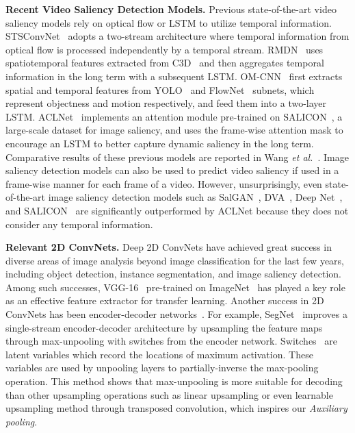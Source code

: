\documentclass[10pt,twocolumn,letterpaper]{article}
\newcommand{\auxpnamet}{Auxiliary pooling}
\newcommand{\auxpname}{\textit{\auxpnamet}}
\begin{document}
\textbf{Recent Video Saliency Detection Models.} Previous state-of-the-art video saliency models  rely on optical flow or LSTM to utilize temporal information. STSConvNet~\cite{bak2018spatio} adopts a two-stream architecture where temporal information from optical flow is processed independently by a temporal stream. RMDN~\cite{bazzani2016recurrent} uses spatiotemporal features extracted from C3D~\cite{tran2015learning} and then aggregates temporal information in the long term with a subsequent LSTM. OM-CNN~\cite{jiang2017predicting} first extracts spatial and temporal features from YOLO~\cite{redmon2016you} and FlowNet~\cite{dosovitskiy2015flownet} subnets, which represent objectness and motion respectively, and feed them into a two-layer LSTM. ACLNet~\cite{wang2018revisiting} implements an attention module pre-trained on SALICON~\cite{jiang2015salicon}, a large-scale dataset for image saliency, and uses the frame-wise attention mask to encourage an LSTM to better capture dynamic saliency in the long term. Comparative results of these previous models are reported in Wang \textit{et al.}~\cite{wang2018revisiting}. Image saliency detection models can also be used to predict video saliency if used in a frame-wise manner for each frame of a video. However, unsurprisingly, even state-of-the-art image saliency detection models such as SalGAN~\cite{pan2017salgan}, DVA~\cite{wang2018deep}, Deep Net~\cite{pan2016shallow}, and SALICON~\cite{huang2015salicon} are significantly outperformed by ACLNet because they does not consider any temporal information.

\textbf{Relevant 2D ConvNets.} Deep 2D ConvNets have achieved great success in diverse areas of image analysis beyond image classification for the last few years, including object detection, instance segmentation, and image saliency detection. Among such successes, VGG-16~\cite{simonyan2014very} pre-trained on ImageNet~\cite{deng2009imagenet} has played a key role as an effective feature extractor for transfer learning. Another success in 2D ConvNets has been encoder-decoder networks~\cite{badrinarayanan2015segnet, noh2015learning, ronneberger2015u}. For example, SegNet~\cite{badrinarayanan2015segnet} improves a single-stream encoder-decoder architecture by upsampling the feature maps through max-unpooling with switches from the encoder network. Switches~\cite{zeiler2011adaptive} are latent variables which record the locations of maximum activation. These variables are used by unpooling layers to partially-inverse the max-pooling operation. This method shows that max-unpooling is more suitable for decoding than other upsampling operations such as linear upsampling or even learnable upsampling method through transposed convolution, which inspires our \auxpname{}.
\end{document}
